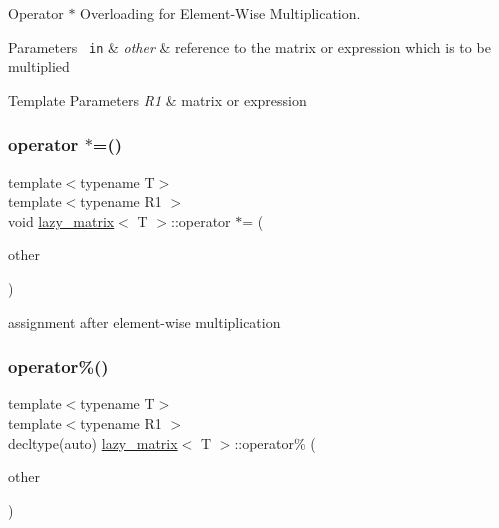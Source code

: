 Operator $\ast$ Overloading for Element-\/\+Wise Multiplication. 


\begin{DoxyParams}[1]{Parameters}
\mbox{\texttt{ in}}  & {\em other} & reference to the matrix or expression which is to be multiplied\\
\hline
\end{DoxyParams}

\begin{DoxyTemplParams}{Template Parameters}
{\em R1} & matrix or expression \\
\hline
\end{DoxyTemplParams}
\mbox{\label{classlazy__matrix_a4299662cd5c146c7fd9b92cccf90467c}} 
\subsubsection{\texorpdfstring{operator $\ast$=()}{operator *=()}}
{\footnotesize\ttfamily template$<$typename T$>$ \\
template$<$typename R1 $>$ \\
void \mbox{\hyperlink{classlazy__matrix}{lazy\+\_\+matrix}}$<$ T $>$\+::operator $\ast$= (\begin{DoxyParamCaption}\item[{const R1 \&}]{other }\end{DoxyParamCaption})\hspace{0.3cm}{\ttfamily [inline]}}



assignment after element-\/wise multiplication 

\mbox{\label{classlazy__matrix_ad6086869ba1a16b7995804e8f3d53aff}} 
\subsubsection{\texorpdfstring{operator\%()}{operator\%()}}
{\footnotesize\ttfamily template$<$typename T$>$ \\
template$<$typename R1 $>$ \\
decltype(auto) \mbox{\hyperlink{classlazy__matrix}{lazy\+\_\+matrix}}$<$ T $>$\+::operator\% (\begin{DoxyParamCaption}\item[{const R1 \&}]{other }\end{DoxyParamCaption})\hspace{0.3cm}{\ttfamily [inline]}}



